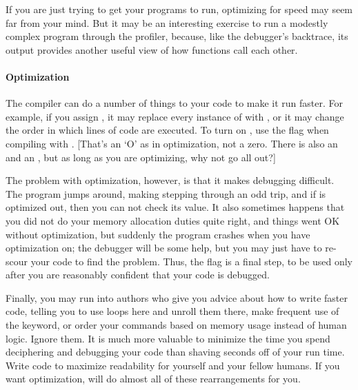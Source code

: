 If you are just trying to get your programs to run, optimizing for speed 
may seem far from your mind. But it may be an interesting exercise to
run a modestly complex program through the profiler, because, like the
debugger's backtrace, its output provides another useful view of how
functions call each other.



\paragraph{Optimization} 
The  compiler can do a number of things to your code to make it
run faster. For example, if you assign , it may replace
every instance of  with , or it may change the order
in which lines of code are executed. To turn on ,
use the  flag when compiling with . [That's an `O'
as in optimization, not a zero. There is also an  and an , but as long as you are optimizing, why not go all out?]

The problem with optimization, however, is that it makes debugging
difficult. The program jumps around, making stepping through an odd
trip, and if  is optimized out, then you can not check its value.
It also sometimes happens that you did not do your memory allocation duties
quite right, and things went OK without optimization, but suddenly the
program crashes when you have optimization on; the debugger will be some
help, but you may just have to re-scour your code to find the problem.
Thus, the  flag is a final step, to be used only after you
are reasonably confident that your code is debugged.

Finally, you may run into authors who give you advice about how to write
faster code, telling you to use loops here and unroll them there, make
frequent use of the  keyword, or order your commands based
on memory usage instead of human logic. Ignore them. It is much more
valuable to minimize the time you spend deciphering and debugging your
code than shaving seconds off of your run time.  Write code to maximize
readability for yourself and your fellow humans. If you want optimization,
 will do almost all of these rearrangements for you.




